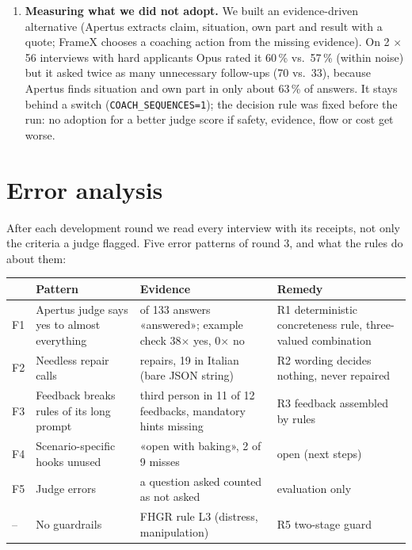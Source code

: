 \documentclass[10pt,a4paper]{article}
\begin{document}
\begin{enumerate}[leftmargin=1.4em,itemsep=3pt]
\item \textbf{Measuring what we did not adopt.} We built an evidence-driven alternative (Apertus extracts claim, situation, own part and result
with a quote; FrameX chooses a coaching action from the missing evidence). On 2 $\times$ 56 interviews with hard applicants Opus rated it 60\,\%
vs.\ 57\,\% (within noise) but it asked twice as many unnecessary follow-ups (70 vs.\ 33), because Apertus finds situation and own part in only
about 63\,\% of answers. It stays behind a switch (\texttt{COACH\_SEQUENCES=1}); the decision rule was fixed before the run: no adoption for a
better judge score if safety, evidence, flow or cost get worse.
\end{enumerate}

\section{Error analysis}
After each development round we read every interview with its receipts, not only the criteria a judge flagged. Five error patterns of round 3,
and what the rules do about them:

\begin{center}\small
\begin{tabularx}{\textwidth}{@{}l>{\raggedright\arraybackslash}p{3.6cm}>{\raggedright\arraybackslash}X>{\raggedright\arraybackslash}p{4.4cm}@{}}
\toprule
& \sffamily\bfseries Pattern & \sffamily\bfseries Evidence & \sffamily\bfseries Remedy \\
\midrule
F1 & Apertus judge says yes to almost everything & 130 of 133 answers «answered»; example check 38$\times$ yes, 0$\times$ no & R1 deterministic concreteness rule, three-valued combination \\
F2 & Needless repair calls & 23 repairs, 19 in Italian (bare JSON string) & R2 wording decides nothing, never repaired \\
F3 & Feedback breaks rules of its long prompt & third person in 11 of 12 feedbacks, mandatory hints missing & R3 feedback assembled by rules \\
F4 & Scenario-specific hooks unused & «open with baking», 2 of 9 misses & open (next steps) \\
F5 & Judge errors & a question asked counted as not asked & evaluation only \\
-- & No guardrails & FHGR rule L3 (distress, manipulation) & R5 two-stage guard \\
\bottomrule
\end{tabularx}
\end{center}
\end{document}
